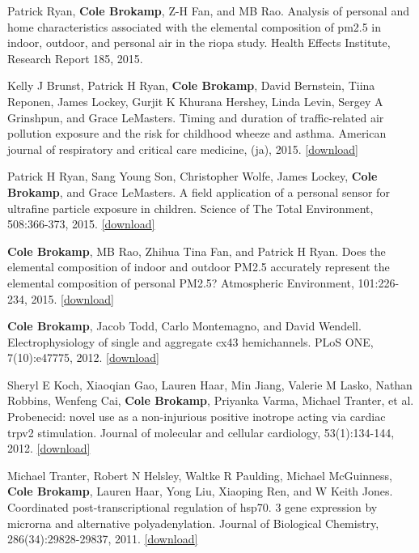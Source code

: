 \documentclass[]{article}
\begin{document}
Patrick Ryan, \textbf{Cole Brokamp}, Z-H Fan, and MB Rao. Analysis of
personal and home characteristics associated with the elemental
composition of pm2.5 in indoor, outdoor, and personal air in the riopa
study. Health Effects Institute, Research Report 185, 2015.

Kelly J Brunst, Patrick H Ryan, \textbf{Cole Brokamp}, David Bernstein,
Tiina Reponen, James Lockey, Gurjit K Khurana Hershey, Linda Levin,
Sergey A Grinshpun, and Grace LeMasters. Timing and duration of
traffic-related air pollution exposure and the risk for childhood wheeze
and asthma. American journal of respiratory and critical care medicine,
(ja), 2015.
\href{https://github.com/cole-brokamp/cole-brokamp.github.io/raw/master/publications/rccm\%252E201407-1314oc.pdf}{{[}download{]}}

Patrick H Ryan, Sang Young Son, Christopher Wolfe, James Lockey,
\textbf{Cole Brokamp}, and Grace LeMasters. A field application of a
personal sensor for ultrafine particle exposure in children. Science of
The Total Environment, 508:366-373, 2015.
\href{https://github.com/cole-brokamp/cole-brokamp.github.io/raw/master/publications/1-s2.0-S0048969714016556-main.pdf}{{[}download{]}}

\textbf{Cole Brokamp}, MB Rao, Zhihua Tina Fan, and Patrick H Ryan. Does
the elemental composition of indoor and outdoor PM2.5 accurately
represent the elemental composition of personal PM2.5? Atmospheric
Environment, 101:226-234, 2015.
\href{https://github.com/cole-brokamp/cole-brokamp.github.io/raw/master/publications/1-s2.0-S1352231014008814-main.pdf}{{[}download{]}}

\textbf{Cole Brokamp}, Jacob Todd, Carlo Montemagno, and David Wendell.
Electrophysiology of single and aggregate cx43 hemichannels. PLoS ONE,
7(10):e47775, 2012.
\href{https://github.com/cole-brokamp/cole-brokamp.github.io/raw/master/publications/journal.pone.0047775.pdf}{{[}download{]}}

Sheryl E Koch, Xiaoqian Gao, Lauren Haar, Min Jiang, Valerie M Lasko,
Nathan Robbins, Wenfeng Cai, \textbf{Cole Brokamp}, Priyanka Varma,
Michael Tranter, et al. Probenecid: novel use as a non-injurious
positive inotrope acting via cardiac trpv2 stimulation. Journal of
molecular and cellular cardiology, 53(1):134-144, 2012.
\href{https://github.com/cole-brokamp/cole-brokamp.github.io/raw/master/publications/nihms-373871.pdf}{{[}download{]}}

Michael Tranter, Robert N Helsley, Waltke R Paulding, Michael
McGuinness, \textbf{Cole Brokamp}, Lauren Haar, Yong Liu, Xiaoping Ren,
and W Keith Jones. Coordinated post-transcriptional regulation of hsp70.
3 gene expression by microrna and alternative polyadenylation. Journal
of Biological Chemistry, 286(34):29828-29837, 2011.
\href{https://github.com/cole-brokamp/cole-brokamp.github.io/raw/master/publications/J.\%20Biol.\%20Chem.-2011-Tranter-29828-37.pdf}{{[}download{]}}
\end{document}
